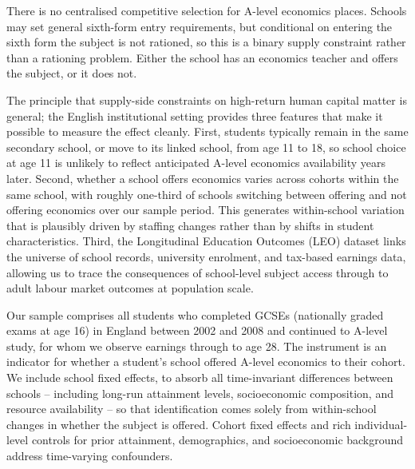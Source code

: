 There is no centralised competitive selection for A-level economics places. Schools may set general sixth-form entry requirements, but conditional on entering the sixth form the subject is not rationed, so this is a binary supply constraint rather than a rationing problem. Either the school has an economics teacher and offers the subject, or it does not.

The principle that supply-side constraints on high-return human capital matter is general; the English institutional setting provides three features that make it possible to measure the effect cleanly. First, students typically remain in the same secondary school, or move to its linked school, from age 11 to 18, so school choice at age 11 is unlikely to reflect anticipated A-level economics availability years later. Second, whether a school offers economics varies across cohorts within the same school, with roughly one-third of schools switching between offering and not offering economics over our sample period. This generates within-school variation that is plausibly driven by staffing changes rather than by shifts in student characteristics. Third, the Longitudinal Education Outcomes (LEO) dataset links the universe of school records, university enrolment, and tax-based earnings data, allowing us to trace the consequences of school-level subject access through to adult labour market outcomes at population scale.


Our sample comprises all students who completed GCSEs (nationally graded exams at age 16) in England between 2002 and 2008 and continued to A-level study, for whom we observe earnings through to age 28. %
The instrument is an indicator for whether a student's school offered A-level economics to their cohort. We include school fixed effects, to absorb all time-invariant differences between schools -- including long-run attainment levels, socioeconomic composition, and resource availability -- so that identification comes solely from within-school changes in whether the subject is offered. Cohort fixed effects and rich individual-level controls for prior attainment, demographics, and socioeconomic background address time-varying confounders.

